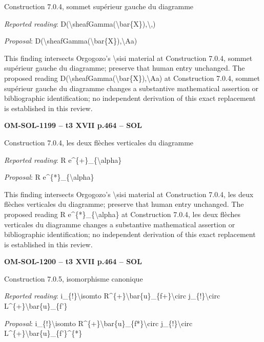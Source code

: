 Construction 7.0.4, sommet supérieur gauche du diagramme\par
\emph{Reported reading}: D(\textbackslash{}sheafGamma(\textbackslash{}bar\{X\}),\textbackslash{},)\par
\emph{Proposal}: D(\textbackslash{}sheafGamma(\textbackslash{}bar\{X\}),\textbackslash{}Aa)\par
This finding intersects Orgogozo's \textbackslash{}sisi material at Construction 7.0.4, sommet supérieur gauche du diagramme; preserve that human entry unchanged. The proposed reading D(\textbackslash{}sheafGamma(\textbackslash{}bar\{X\}),\textbackslash{}Aa) at Construction 7.0.4, sommet supérieur gauche du diagramme changes a substantive mathematical assertion or bibliographic identification; no independent derivation of this exact replacement is established in this review.\par
\par\noindent\textbf{OM-SOL-1199 -- t3 XVII p.464 -- SOL}\par
Construction 7.0.4, les deux flèches verticales du diagramme\par
\emph{Reported reading}: R e\textasciicircum{}\{+\}\_\{\textbackslash{}alpha\}\par
\emph{Proposal}: R e\textasciicircum{}\{*\}\_\{\textbackslash{}alpha\}\par
This finding intersects Orgogozo's \textbackslash{}sisi material at Construction 7.0.4, les deux flèches verticales du diagramme; preserve that human entry unchanged. The proposed reading R e\textasciicircum{}\{*\}\_\{\textbackslash{}alpha\} at Construction 7.0.4, les deux flèches verticales du diagramme changes a substantive mathematical assertion or bibliographic identification; no independent derivation of this exact replacement is established in this review.\par
\par\noindent\textbf{OM-SOL-1200 -- t3 XVII p.464 -- SOL}\par
Construction 7.0.5, isomorphisme canonique\par
\emph{Reported reading}: i\_\{!\}\textbackslash{}isomto R\textasciicircum{}\{+\}\textbackslash{}bar\{u\}\_\{f+\}\textbackslash{}circ j\_\{!\}\textbackslash{}circ L\textasciicircum{}\{+\}\textbackslash{}bar\{u\}\_\{f'\}\par
\emph{Proposal}: i\_\{!\}\textbackslash{}isomto R\textasciicircum{}\{+\}\textbackslash{}bar\{u\}\_\{f*\}\textbackslash{}circ j\_\{!\}\textbackslash{}circ L\textasciicircum{}\{+\}\textbackslash{}bar\{u\}\_\{f'\}\textasciicircum{}\{*\}\par
